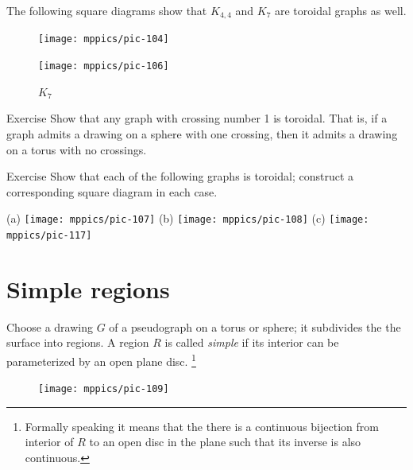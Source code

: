 The following square diagrams show that $K_{4,4}$ and $K_7$ are toroidal graphs as well.

\begin{figure}[h!]
\begin{minipage}{.48\textwidth}
\centering
\texttt{[image: mppics/pic-104]}
\end{minipage}\hfill
\begin{minipage}{.48\textwidth}
\centering
\texttt{[image: mppics/pic-106]}\label{K5-toroidal}
\end{minipage}

\medskip

\begin{minipage}{.45\textwidth}
\centering
\caption*{$K_{4,4}$}
\end{minipage}\hfill
\begin{minipage}{.45\textwidth}
\centering
\caption*{$K_7$}
\end{minipage}
\vskip-4mm
\end{figure}




\begin{thm}{Exercise}
Show that any graph with crossing number 1 is toroidal.
That is, if a graph admits a drawing on a sphere with one crossing, then it admits a drawing on a torus with no crossings.
\end{thm}


\begin{thm}{Exercise}
Show that each of the following graphs is toroidal; construct a corresponding square diagram in each case.

(a) \texttt{[image: mppics/pic-107]}
(b) \texttt{[image: mppics/pic-108]}
(c) \texttt{[image: mppics/pic-117]}
\end{thm}


\section*{Simple regions}

Choose a drawing $G$ of a pseudograph on a torus or sphere;
it subdivides the the surface into regions.
A region $R$ is called \emph{simple} if its interior can be parameterized by an open plane disc.%
\footnote{Formally speaking it means that the there is a continuous bijection from interior of $R$ to an open disc in the plane such that its inverse is also continuous.}

\begin{figure}
\vskip-4mm
\centering
\texttt{[image: mppics/pic-109]}
\end{figure}


